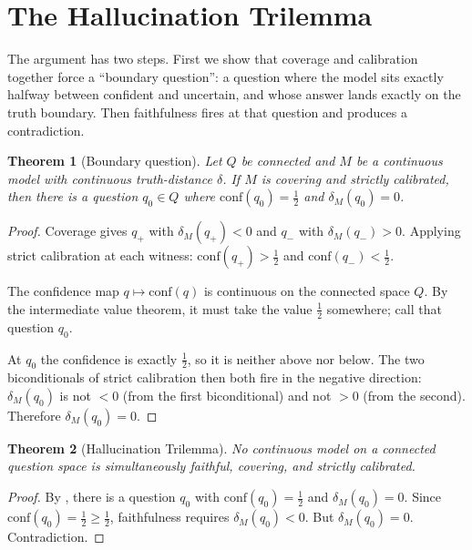 \documentclass[10pt]{article}
\newtheorem{theorem}{Theorem}[section]
\newcommand{\conf}{\mathrm{conf}}
\begin{document}
\section{The Hallucination Trilemma}
\label{sec:trilemma}

The argument has two steps. First we show that coverage and calibration
together force a ``boundary question'': a question where the
model sits exactly halfway between confident and uncertain, and whose
answer lands exactly on the truth boundary. Then faithfulness fires at
that question and produces a contradiction.

\begin{theorem}[Boundary question]
\label{thm:boundary}
Let $Q$ be connected and $M$ be a continuous model with continuous
truth-distance $\delta$. If $M$ is covering and strictly calibrated, then
there is a question $q_0 \in Q$ where $\conf(q_0) = \tfrac{1}{2}$ and
$\delta_M(q_0) = 0$.
\end{theorem}

\begin{proof}
Coverage gives $q_+$ with $\delta_M(q_+) < 0$ and $q_-$ with $\delta_M(q_-)
> 0$. Applying strict calibration at each witness: $\conf(q_+) > \tfrac{1}{2}$
and $\conf(q_-) < \tfrac{1}{2}$.

The confidence map $q \mapsto \conf(q)$ is continuous on the connected
space $Q$. By the intermediate value theorem, it must take the value
$\tfrac{1}{2}$ somewhere; call that question $q_0$.

At $q_0$ the confidence is exactly $\tfrac{1}{2}$, so it is neither above
nor below. The two biconditionals of strict calibration then both fire in
the negative direction: $\delta_M(q_0)$ is not $< 0$ (from the first
biconditional) and not $> 0$ (from the second). Therefore $\delta_M(q_0)
= 0$.
\end{proof}

\begin{theorem}[Hallucination Trilemma]
\label{thm:trilemma}
No continuous model on a connected question space is simultaneously
faithful, covering, and strictly calibrated.
\end{theorem}

\begin{proof}
By , there is a question $q_0$ with $\conf(q_0) =
\tfrac{1}{2}$ and $\delta_M(q_0) = 0$. Since $\conf(q_0) = \tfrac{1}{2}
\geq \tfrac{1}{2}$, faithfulness requires $\delta_M(q_0) < 0$. But
$\delta_M(q_0) = 0$. Contradiction.
\end{proof}
\end{document}
